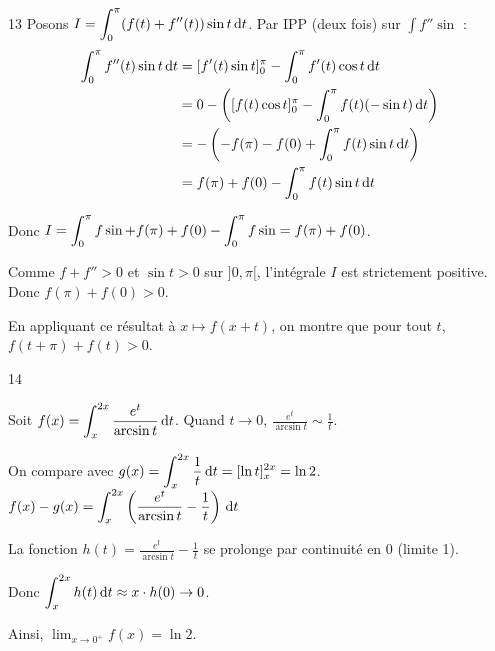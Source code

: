 \begin{correction}{13}
    Posons $\displaystyle I = \int_0^\pi (f(t)+f''(t)) \sin t \,\mathrm{d} t$.
    Par IPP (deux fois) sur $\int f'' \sin$ :
    \begin{align*}
        \int_0^\pi f''(t) \sin t \,\mathrm{d} t &= [f'(t)\sin t]_0^\pi - \int_0^\pi f'(t) \cos t \,\mathrm{d}t \\
        &= 0 - \left([f(t)\cos t]_0^\pi - \int_0^\pi f(t)(-\sin t)\,\mathrm{d}t\right) \\
        &= - \left(-f(\pi) - f(0) + \int_0^\pi f(t) \sin t \,\mathrm{d}t\right) \\
        &= f(\pi)+f(0) - \int_0^\pi f(t) \sin t \,\mathrm{d}t
    \end{align*}
    
    Donc $\displaystyle I = \int_0^{\pi} f \sin + f(\pi)+f(0) - \int_0^{\pi} f \sin = f(\pi)+f(0)$.

    Comme $f+f''>0$ et $\sin t > 0$ sur $]0,\pi[$, l'intégrale $I$ est strictement positive.
    Donc $f(\pi)+f(0) > 0$.

    En appliquant ce résultat à $x \mapsto f(x+t)$, on montre que pour tout $t$, $f(t+\pi)+f(t) > 0$.
\end{correction}

\begin{correction}{14}

    Soit $\displaystyle f(x) = \int_x^{2x} \frac{e^t}{\arcsin t} \,\mathrm{d}t$.
    Quand $t \to 0$, $\frac{e^t}{\arcsin t} \sim \frac{1}{t}$.

    On compare avec $\displaystyle g(x) = \int_x^{2x} \frac{1}{t} \,\mathrm{d}t = [\ln t]_x^{2x} = \ln 2$.
    $\displaystyle f(x) - g(x) = \int_x^{2x} \left(\frac{e^t}{\arcsin t} - \frac{1}{t}\right) \,\mathrm{d}t$

    La fonction $h(t) = \frac{e^t}{\arcsin t} - \frac{1}{t}$ se prolonge par continuité en 0 (limite 1).
    
    Donc $\displaystyle \int_x^{2x} h(t) \,\mathrm{d} t \approx x \cdot h(0) \to 0$.

    Ainsi, $\lim_{x\to 0^+} f(x) = \ln 2$.
\end{correction}

